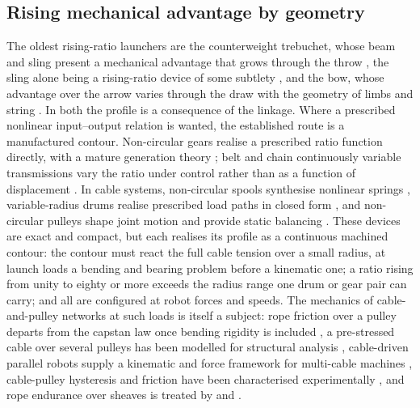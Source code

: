 \documentclass[preprint,12pt,number]{elsarticle}
\begin{document}
\subsection{Rising mechanical advantage by geometry}

The oldest rising-ratio launchers are the counterweight trebuchet, whose beam and sling present a mechanical advantage that grows through the throw \citep{chevedden1995,denny2005}, the sling alone being a rising-ratio device of some subtlety \citep{denny2025}, and the bow, whose advantage over the arrow varies through the draw with the geometry of limbs and string \citep{kooi1991}. In both the profile is a consequence of the linkage. Where a prescribed nonlinear input--output relation is wanted, the established route is a manufactured contour. Non-circular gears realise a prescribed ratio function directly, with a mature generation theory \citep{litvin2009,mundo2006}; belt and chain continuously variable transmissions vary the ratio under control rather than as a function of displacement \citep{srivastava2009}. In cable systems, non-circular spools synthesise nonlinear springs \citep{schmit2012,kim2014}, variable-radius drums realise prescribed load paths in closed form \citep{seriani2016}, and non-circular pulleys shape joint motion and provide static balancing \citep{shirafuji2017,fedorov2018}. These devices are exact and compact, but each realises its profile as a continuous machined contour: the contour must react the full cable tension over a small radius, at launch loads a bending and bearing problem before a kinematic one; a ratio rising from unity to eighty or more exceeds the radius range one drum or gear pair can carry; and all are configured at robot forces and speeds. The mechanics of cable-and-pulley networks at such loads is itself a subject: rope friction over a pulley departs from the capstan law once bending rigidity is included \citep{jung2008}, a pre-stressed cable over several pulleys has been modelled for structural analysis \citep{spiegelhauer2021}, cable-driven parallel robots supply a kinematic and force framework for multi-cable machines \citep{pott2018}, cable-pulley hysteresis and friction have been characterised experimentally \citep{miyasaka2020}, and rope endurance over sheaves is treated by \citet{feyrer2015} and \citet{mckenna2004}.
\end{document}
